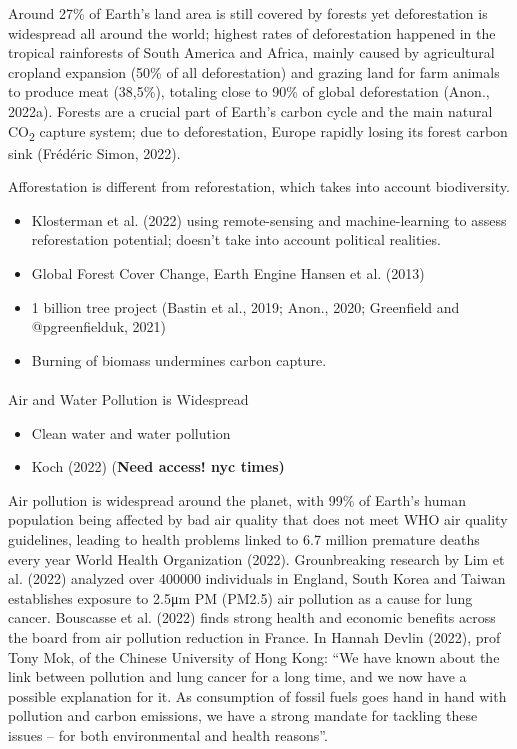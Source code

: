 \documentclass[
  letterpaper,
  DIV=11,
  numbers=noendperiod]{scrartcl}
\makeatletter
\let\oldparagraph\paragraph
\renewcommand{\paragraph}{
    \@ifstar
      \xxxParagraphStar
      \xxxParagraphNoStar
  }
\newcommand{\xxxParagraphStar}[1]{\oldparagraph*{#1}\mbox{}}
\newcommand{\xxxParagraphNoStar}[1]{\oldparagraph{#1}\mbox{}}
\providecommand{\tightlist}{%
  \setlength{\itemsep}{0pt}\setlength{\parskip}{0pt}}\usepackage{longtable,booktabs,array}
\makeatother
\begin{document}
Around 27\% of Earth's land area is still covered by forests yet
deforestation is widespread all around the world; highest rates of
deforestation happened in the tropical rainforests of South America and
Africa, mainly caused by agricultural cropland expansion (50\% of all
deforestation) and grazing land for farm animals to produce meat
(38,5\%), totaling close to 90\% of global deforestation (Anon., 2022a).
Forests are a crucial part of Earth's carbon cycle and the main natural
CO\textsubscript{2} capture system; due to deforestation, Europe rapidly
losing its forest carbon sink (Frédéric Simon, 2022).

Afforestation is different from reforestation, which takes into account
biodiversity.

\begin{itemize}
\item
  Klosterman et al. (2022) using remote-sensing and machine-learning to
  assess reforestation potential; doesn't take into account political
  realities.
\item
  Global Forest Cover Change, Earth Engine Hansen et al. (2013)
\item
  1 billion tree project (Bastin et al., 2019; Anon., 2020; Greenfield
  and @pgreenfielduk, 2021)
\item
  Burning of biomass undermines carbon capture.
\end{itemize}

\paragraph{Air and Water Pollution is
Widespread}\label{air-and-water-pollution-is-widespread}

\begin{itemize}
\tightlist
\item
  Clean water and water pollution
\item
  Koch (2022) (\textbf{Need access! nyc times)}
\end{itemize}

Air pollution is widespread around the planet, with 99\% of Earth's
human population being affected by bad air quality that does not meet
WHO air quality guidelines, leading to health problems linked to 6.7
million premature deaths every year World Health Organization (2022).
Grounbreaking research by Lim et al. (2022) analyzed over 400000
individuals in England, South Korea and Taiwan establishes exposure to
2.5μm PM (PM2.5) air pollution as a cause for lung cancer. Bouscasse et
al. (2022) finds strong health and economic benefits across the board
from air pollution reduction in France. In Hannah Devlin (2022), prof
Tony Mok, of the Chinese University of Hong Kong: ``We have known about
the link between pollution and lung cancer for a long time, and we now
have a possible explanation for it. As consumption of fossil fuels goes
hand in hand with pollution and carbon emissions, we have a strong
mandate for tackling these issues -- for both environmental and health
reasons''.
\end{document}
